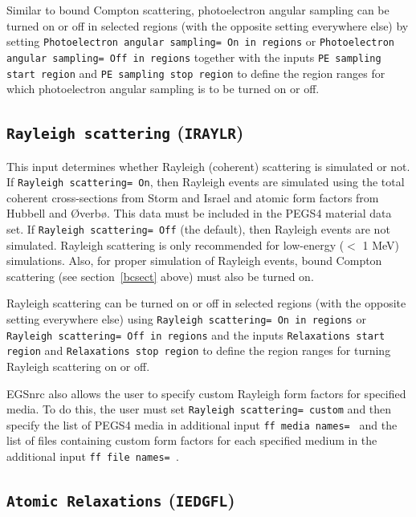 \documentclass[12pt,twoside]{article}      %
\begin{document}
Similar to bound Compton scattering, photoelectron angular sampling
can be turned on or off in selected regions (with the opposite setting
everywhere else) by setting
{\tt Photoelectron angular sampling= On in regions} or
{\tt Photoelectron angular sampling= Off in regions} together with
the inputs {\tt PE sampling start region} and
{\tt PE sampling stop region} to define the region ranges for which
photoelectron angular sampling is to be turned on or off.

\subsection{{\tt Rayleigh scattering} ({\tt IRAYLR})}
\label{rayleighsect}

This input determines whether Rayleigh (coherent) scattering is
simulated or not.
If {\tt Rayleigh scattering= On}, then Rayleigh events are simulated
using the total coherent cross-sections from Storm and
Israel\cite{SI70} and atomic form factors from Hubbell and {\O}verb{\o}\cite{HO79}.
This data must be included in the PEGS4 material data set.
If {\tt Rayleigh scattering= Off} (the default), then Rayleigh
events are not simulated.  Rayleigh scattering is only recommended for
low-energy ($<$ 1 MeV) simulations.  Also, for proper simulation
of Rayleigh events, bound Compton scattering (see section~\ref{bcsect} above)
must also be turned on.

Rayleigh scattering can be turned on or off in selected regions
(with the opposite setting everywhere else) using
{\tt Rayleigh scattering= On in regions} or {\tt Rayleigh scattering= Off
in regions} and the inputs
{\tt Relaxations start region} and {\tt Relaxations stop region} to
define the region ranges for turning Rayleigh scattering on or off.

EGSnrc also allows the user to specify custom Rayleigh form factors for
specified media.  To do this, the user must
set {\tt Rayleigh scattering= custom} and then specify the list of
PEGS4 media in additional input {\tt ff media names= } and the list of
files containing custom form factors for each specified
medium in the additional input {\tt ff file names= }.

\subsection{{\tt Atomic Relaxations} ({\tt IEDGFL})}
\end{document}
